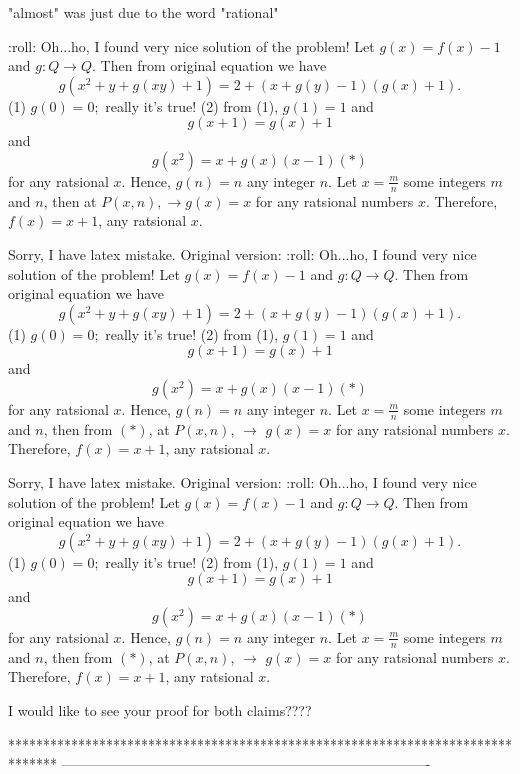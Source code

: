 \begin{mysolution}
	"almost" was just due to the word "rational"  
\end{mysolution}



\begin{mysolution}
	:roll: 
Oh...ho, I  found very nice solution of the problem!
Let  $g(x)=f(x)-1$  and  $ g:Q\rightarrow Q $.  Then from original equation  we have \[ g(x^2+y+g(xy)+1)=2+(x+g(y)-1)(g(x)+1) .\]
(1) $g(0)=0; $  really it's true!
(2)  from (1),  $ g(1)=1 $  and 
\[ g(x+1)=g(x)+1 \] and \[ g(x^2)=x+g(x)(x-1) (*)\]
for any ratsional $x$.
Hence, $ g(n)=n $ any integer $n$.    Let $x=\frac{m}{n} $ some integers $m$ and $n$,  then  at $P(x,n), \rightarrow g(x)=x $ for any ratsional numbers $x$.
Therefore, $f(x)=x+1$, any ratsional $x$.
\end{mysolution}



\begin{mysolution}
	Sorry, I have latex mistake. Original version:  
 :roll: 
Oh...ho, I  found very nice solution of the problem!
Let  $g(x)=f(x)-1$  and  $ g:Q\rightarrow Q $.  Then from original equation  we have \[ g(x^2+y+g(xy)+1)=2+(x+g(y)-1)(g(x)+1) .\]
(1) $g(0)=0; $  really it's true!
(2)  from (1),  $ g(1)=1 $  and 
\[ g(x+1)=g(x)+1 \] and \[ g(x^2)=x+g(x)(x-1) (*)\]
for any ratsional $x$.
Hence, $ g(n)=n $ any integer $n$.    Let $x=\frac{m}{n} $ some integers $m$ and $n$,  then from $(*)$, at $P(x,n)$, $\rightarrow $ $g(x)=x $ for any ratsional numbers $x$.
Therefore, $f(x)=x+1$, any ratsional $x$.
\end{mysolution}



\begin{mysolution}
	\begin{tcolorbox}Sorry, I have latex mistake. Original version:  
 :roll: 
Oh...ho, I  found very nice solution of the problem!
Let  $g(x)=f(x)-1$  and  $ g:Q\rightarrow Q $.  Then from original equation  we have \[ g(x^2+y+g(xy)+1)=2+(x+g(y)-1)(g(x)+1) .\]
(1) $g(0)=0; $  really it's true!
(2)  from (1),  $ g(1)=1 $  and 
\[ g(x+1)=g(x)+1 \] and \[ g(x^2)=x+g(x)(x-1) (*)\]
for any ratsional $x$.
Hence, $ g(n)=n $ any integer $n$.    Let $x=\frac{m}{n} $ some integers $m$ and $n$,  then from $(*)$, at $P(x,n)$, $\rightarrow $ $g(x)=x $ for any ratsional numbers $x$.
Therefore, $f(x)=x+1$, any ratsional $x$.\end{tcolorbox}

I would like to see your proof for both claims???? 
\end{mysolution}
*******************************************************************************
-------------------------------------------------------------------------------


